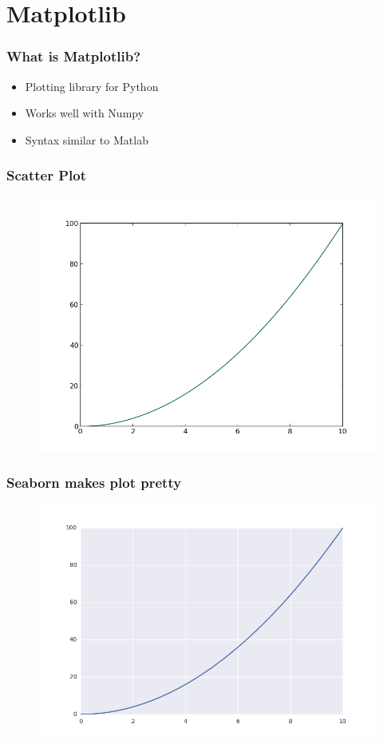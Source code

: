 \section{Matplotlib} %
\label{sec:section_name}

\begin{frame}
\frametitle{What is Matplotlib?}


\begin{itemize}
    \item Plotting library for Python
    \item Works well with Numpy
    \item Syntax similar to Matlab
\end{itemize}

\end{frame}

\begin{frame}
\frametitle{Scatter Plot}
\lstset{basicstyle=\scriptsize}
\begin{figure}[h]
\includegraphics[width=.6\textwidth]{img/line_plot.png}
\end{figure}
\end{frame}

\begin{frame}
\frametitle{Seaborn makes plot pretty}
\lstset{basicstyle=\scriptsize}
\begin{figure}[h]
\includegraphics[width=.6\textwidth]{img/lineplot_sns.png}
\end{figure}
\end{frame}


